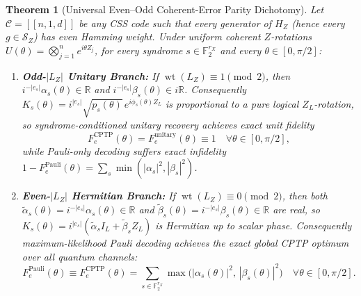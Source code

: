 \documentclass[11pt,a4paper]{article}
\theoremstyle{plain}
\newtheorem{theorem}{Theorem}[section]
\theoremstyle{definition}
\newcommand{\Ftwo}{\mathbb{F}_2}
\newcommand{\R}{\mathbb{R}}
\newcommand{\SZ}{\mathcal{S}_Z}
\newcommand{\wt}{\operatorname{wt}}
\begin{document}
\begin{theorem}[Universal Even--Odd Coherent-Error Parity Dichotomy]
\label{thm:parity-dichotomy}
Let $\mathcal{C} = [[n, 1, d]]$ be any CSS code such that every generator of $H_Z$ (hence every $g \in \SZ$) has even Hamming weight. Under uniform coherent $Z$-rotations $U(\theta) = \bigotimes_{j=1}^n e^{i\theta Z_j}$, for every syndrome $s \in \Ftwo^{r_X}$ and every $\theta \in [0,\pi/2]$:
\begin{enumerate}[label=(\alph*),leftmargin=1.8em,itemsep=2pt]
  \item \textbf{Odd-$|L_Z|$ Unitary Branch:} If $\wt(L_Z) \equiv 1 \pmod 2$, then $i^{-|e_s|}\alpha_s(\theta) \in \R$ and $i^{-|e_s|}\beta_s(\theta) \in i\R$. Consequently $K_s(\theta) = i^{|e_s|}\sqrt{p_s(\theta)}\, e^{i\phi_s(\theta) Z_L}$ is proportional to a pure logical $Z_L$-rotation, so syndrome-conditioned unitary recovery achieves exact unit fidelity
  \begin{equation}
    F_e^{\mathrm{CPTP}}(\theta) = F_e^{\mathrm{unitary}}(\theta) \equiv 1 \quad \forall \theta \in [0,\pi/2],
  \end{equation}
  while Pauli-only decoding suffers exact infidelity $1 - F_e^{\mathrm{Pauli}}(\theta) = \sum_s \min(|\alpha_s|^2, |\beta_s|^2)$.
  \item \textbf{Even-$|L_Z|$ Hermitian Branch:} If $\wt(L_Z) \equiv 0 \pmod 2$, then both $\tilde{\alpha}_s(\theta) = i^{-|e_s|}\alpha_s(\theta) \in \R$ and $\tilde{\beta}_s(\theta) = i^{-|e_s|}\beta_s(\theta) \in \R$ are real, so $K_s(\theta) = i^{|e_s|}(\tilde{\alpha}_s I_L + \tilde{\beta}_s Z_L)$ is Hermitian up to scalar phase. Consequently maximum-likelihood Pauli decoding achieves the exact global CPTP optimum over all quantum channels:
  \begin{equation}
    F_e^{\mathrm{Pauli}}(\theta) \equiv F_e^{\mathrm{CPTP}}(\theta) = \sum_{s \in \Ftwo^{r_X}} \max\!\big(|\alpha_s(\theta)|^2,\, |\beta_s(\theta)|^2\big) \quad \forall \theta \in [0,\pi/2].
  \end{equation}
\end{enumerate}
\end{theorem}
\end{document}
